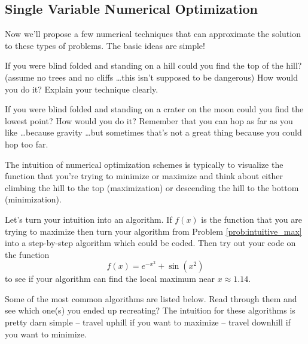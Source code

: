 \newpage\subsection{Single Variable Numerical Optimization}

Now we'll propose a few numerical techniques that can approximate the solution to these
types of problems.  The basic ideas are simple!

\begin{problem}\label{prob:intuitive_max}
    If you were blind folded and standing on a hill could you find the top of the hill?
    (assume no trees and no cliffs \ldots this isn't supposed to be dangerous)  How would
    you do it?  Explain your technique clearly.
\end{problem}

\begin{problem}
    If you were blind folded and standing on a crater on the moon could you find the
    lowest point?  How would you do it?  Remember that you can hop as far as you like
    \ldots because gravity \ldots but sometimes that's not a great thing because you could
    hop too far.
\end{problem}

The intuition of numerical optimization schemes is typically to visualize the function that
you're trying to minimize or maximize and think about either climbing the hill to the top
(maximization) or descending the hill to the bottom (minimization).  

\begin{problem}
    Let's turn your intuition into an algorithm.  If $f(x)$ is the function that you are
    trying to maximize then turn your algorithm from Problem \ref{prob:intuitive_max} into
    a step-by-step algorithm which could be coded. Then try out your code on the function 
    \[ f(x) = e^{-x^2} + \sin(x^2) \]
    to see if your algorithm can find the local maximum near $x \approx 1.14$.
\end{problem}

Some of the most common algorithms are listed below.  Read through them and see which
one(s) you ended up recreating?  The intuition for these algorithms is pretty darn simple
-- travel uphill if you want to maximize -- travel downhill if you want to minimize.

